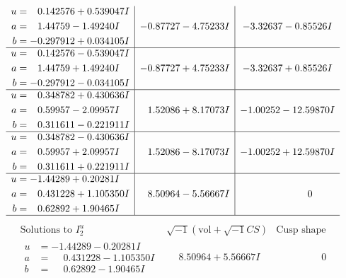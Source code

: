 \documentclass[1p]{elsarticle_modified}
\theoremstyle{definition}
\newcommand{\I}{\sqrt{-1}}
\begin{document}
$$\begin{array}{c|c|c}
\begin{aligned}
u &= \phantom{-}0.142576 + 0.539047 I \\
a &= \phantom{-}1.44759 - 1.49240 I \\
b &= -0.297912 + 0.034105 I\end{aligned}
 & -0.87727 - 4.75233 I & -3.32637 - 0.85526 I \\ \hline\begin{aligned}
u &= \phantom{-}0.142576 - 0.539047 I \\
a &= \phantom{-}1.44759 + 1.49240 I \\
b &= -0.297912 - 0.034105 I\end{aligned}
 & -0.87727 + 4.75233 I & -3.32637 + 0.85526 I \\ \hline\begin{aligned}
u &= \phantom{-}0.348782 + 0.430636 I \\
a &= \phantom{-}0.59957 - 2.09957 I \\
b &= \phantom{-}0.311611 - 0.221911 I\end{aligned}
 & \phantom{-}1.52086 + 8.17073 I & -1.00252 - 12.59870 I \\ \hline\begin{aligned}
u &= \phantom{-}0.348782 - 0.430636 I \\
a &= \phantom{-}0.59957 + 2.09957 I \\
b &= \phantom{-}0.311611 + 0.221911 I\end{aligned}
 & \phantom{-}1.52086 - 8.17073 I & -1.00252 + 12.59870 I \\ \hline\begin{aligned}
u &= -1.44289 + 0.20281 I \\
a &= \phantom{-}0.431228 + 1.105350 I \\
b &= \phantom{-}0.62892 + 1.90465 I\end{aligned}
 & \phantom{-}8.50964 - 5.56667 I & \phantom{-0.000000 } 0\\
 \hline 
 \end{array}$$\newpage$$\begin{array}{c|c|c}  
\text{Solutions to }I^u_{2}& \I (\text{vol} + \sqrt{-1}CS) & \text{Cusp shape}\\
 \hline 
\begin{aligned}
u &= -1.44289 - 0.20281 I \\
a &= \phantom{-}0.431228 - 1.105350 I \\
b &= \phantom{-}0.62892 - 1.90465 I\end{aligned}
 & \phantom{-}8.50964 + 5.56667 I & \phantom{-0.000000 } 0 \\ \hline\begin{aligned}

\end{aligned}
\end{array}$$
\end{document}
